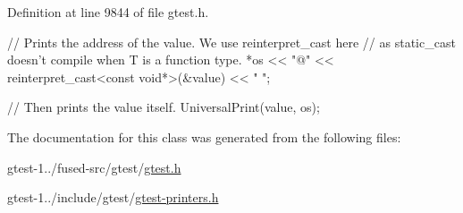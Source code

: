 \-Definition at line 9844 of file gtest.\-h.


\begin{DoxyCode}
                                                    {
    // Prints the address of the value.  We use reinterpret_cast here
    // as static_cast doesn't compile when T is a function type.
    *os << "@" << reinterpret_cast<const void*>(&value) << " ";

    // Then prints the value itself.
    UniversalPrint(value, os);
  }
\end{DoxyCode}


\-The documentation for this class was generated from the following files\-:\begin{DoxyCompactItemize}
\item 
gtest-\/1../fused-\/src/gtest/\hyperlink{fused-src_2gtest_2gtest_8h}{gtest.\-h}\item 
gtest-\/1../include/gtest/\hyperlink{gtest-printers_8h}{gtest-\/printers.\-h}\end{DoxyCompactItemize}
